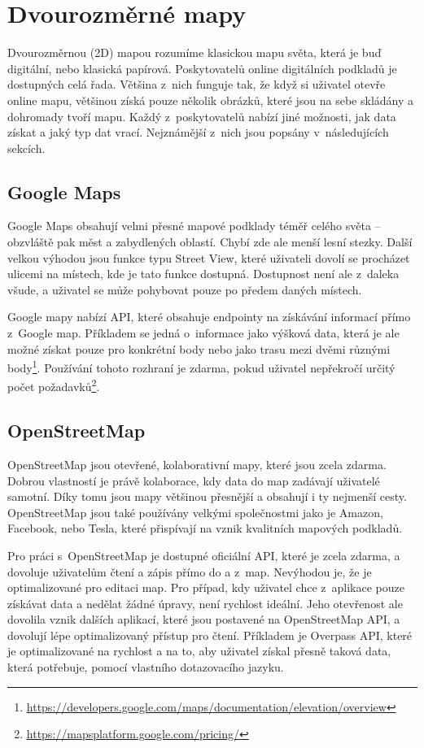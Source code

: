 \section{Dvourozměrné mapy} \label{2Dmaps}
Dvourozměrnou (2D) mapou rozumíme klasickou mapu světa, která je buď digitální, nebo klasická papírová. Poskytovatelů online digitálních podkladů je dostupných celá řada. Většina z~nich funguje tak, že když si uživatel otevře online mapu, většinou získá pouze několik obrázků, které jsou na sebe skládány a dohromady tvoří mapu. Každý z~poskytovatelů nabízí jiné možnosti, jak data získat a jaký typ dat vrací. Nejznámější z~nich jsou popsány v~následujících sekcích.

\subsection*{Google Maps}
Google Maps obsahují velmi přesné mapové podklady téměř celého světa -- obzvláště pak měst a zabydlených oblastí. Chybí zde ale menší lesní stezky. Další velkou výhodou jsou funkce typu Street View, které uživateli dovolí se  procházet ulicemi na místech, kde je tato funkce dostupná. Dostupnost není ale z~daleka všude, a uživatel se může pohybovat pouze po předem daných místech.

Google mapy nabízí API, které obsahuje endpointy na získávání informací přímo z~Google map. Příkladem se jedná o~informace jako výšková data, která je ale možné získat pouze pro konkrétní body nebo jako trasu mezi dvěmi různými body\footnote{\href{https://developers.google.com/maps/documentation/elevation/overview}{https://developers.google.com/maps/documentation/elevation/overview}}. Používání tohoto rozhraní je zdarma, pokud uživatel nepřekročí určitý počet požadavků\footnote{\href{https://mapsplatform.google.com/pricing/}{https://mapsplatform.google.com/pricing/}}.


\subsection*{OpenStreetMap}
OpenStreetMap jsou otevřené, kolaborativní mapy, které jsou zcela zdarma. Dobrou vlastností je právě kolaborace, kdy data do map zadávají uživatelé samotní. Díky tomu jsou mapy většinou přesnější a obsahují i ty nejmenší cesty. OpenStreetMap jsou také používány velkými společnostmi jako je Amazon, Facebook, nebo Tesla, které přispívají na vznik kvalitních mapových podkladů.

Pro práci s~OpenStreetMap je dostupné oficiální API, které je zcela zdarma, a dovoluje uživatelům čtení a zápis přímo do a z~map. Nevýhodou je, že je optimalizované pro editaci map. Pro případ, kdy uživatel chce z~aplikace pouze získávat data a nedělat žádné úpravy, není rychlost ideální. Jeho otevřenost ale dovolila vznik dalších aplikací, které jsou postavené na OpenStreetMap API, a dovolují lépe optimalizovaný přístup pro čtení. Příkladem je Overpass API, které je optimalizované na rychlost a na to, aby uživatel získal přesně taková data, která potřebuje, pomocí vlastního dotazovacího jazyku.

